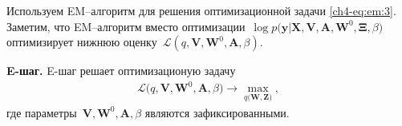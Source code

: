\documentclass{dissert}
\newcommand{\paragraph}[1]{\noindent\textbf{#1}\quad}
\begin{document}
Используем EM--алгоритм для решения оптимизационной задачи \eqref{ch4-eq:em:3}. Заметим, что EM--алгоритм вместо оптимизации~$\log p\bigr(\mathbf{y}|\mathbf{X}, \mathbf{V}, \textbf{A}, \textbf{W}^{0}, \bm{\Xi}, \beta\bigr)$ оптимизирует нижнюю оценку~$\mathcal{L}\left(q, \textbf{V}, \textbf{W}^{0}, \textbf{A}, \beta\right)$.


\paragraph{E-шаг.} E-шаг решает оптимизационую задачу
\[
\label{ch4-eq:em:new:3}
\begin{aligned}
\mathcal{L}\bigr(q, \textbf{V}, \textbf{W}^{0}, \textbf{A}, \beta\bigr) \to \max_{q\bigr(\textbf{W}, \textbf{Z}\bigr)},
\end{aligned}
\]
где параметры~$\textbf{V}, \textbf{W}^{0}, \textbf{A}, \beta$ являются зафиксированными.
\end{document}
